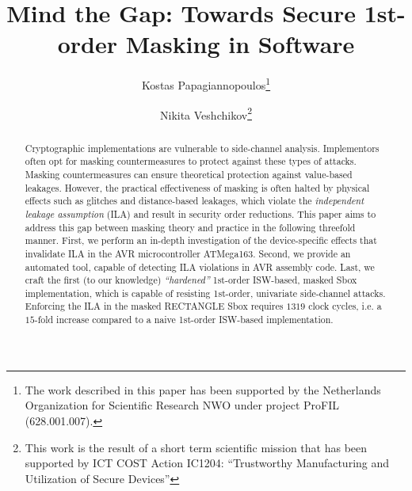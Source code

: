 \documentclass[runningheads, a4paper, 10pt]{llncs}
\begin{document}



\title{Mind the Gap: Towards Secure 1st-order Masking in Software}

\author{
Kostas Papagiannopoulos\thanks{The work described in this paper has been supported 
by the Netherlands Organization for Scientific Research NWO under project ProFIL (628.001.007).}
\and
Nikita Veshchikov\thanks{This work is the result of a short term scientific mission 
that has been supported by ICT COST Action IC1204:
``Trustworthy Manufacturing and Utilization of Secure Devices''}
}






\maketitle

\begin{abstract}
Cryptographic implementations are vulnerable to side-channel analysis. 
Implementors often opt for masking countermeasures to protect against these types of attacks.
Masking countermeasures can ensure theoretical protection against value-based leakages. However, the practical effectiveness of masking is often halted by 
physical effects such as glitches and distance-based leakages, which violate the \emph{independent leakage assumption} (ILA) and result in security order reductions. This paper aims to address this gap between masking theory and practice in the following threefold manner. First, we perform an in-depth investigation of the device-specific effects that invalidate ILA in the AVR microcontroller ATMega163. Second, we provide an automated tool, capable of detecting ILA violations in AVR assembly code. Last, we craft the first (to our knowledge) \emph{``hardened''} 1st-order ISW-based, masked Sbox implementation, which is capable of resisting 1st-order, univariate side-channel attacks. Enforcing the ILA in the masked RECTANGLE Sbox requires $1319$ clock cycles, i.e. a $15$-fold increase compared  to a naive 1st-order ISW-based implementation. 


\end{abstract}
\end{document}
